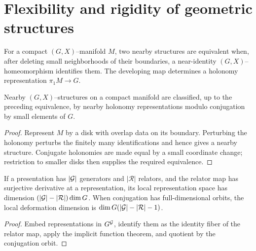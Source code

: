 \chapter{Flexibility and rigidity of geometric structures}

\begin{definition}
\label{thurston-ch05-holonomy-deformation-equivalence}
For a compact $(G,X)$--manifold $M$, two nearby structures are equivalent when, after deleting small neighborhoods of their boundaries, a near-identity $(G,X)$--homeomorphism identifies them.  The developing map determines a holonomy representation $\pi_1M\to G$.
\end{definition}

\begin{proposition}
\label{thurston-ch05-local-holonomy}
Nearby $(G,X)$--structures on a compact manifold are classified, up to the preceding equivalence, by nearby holonomy representations modulo conjugation by small elements of $G$.
\end{proposition}
\begin{proof}\sketch Represent $M$ by a disk with overlap data on its boundary.  Perturbing the holonomy perturbs the finitely many identifications and hence gives a nearby structure.  Conjugate holonomies are made equal by a small coordinate change; restriction to smaller disks then supplies the required equivalence.\end{proof}

\begin{proposition}
\label{thurston-ch05-generic-representation-dimension}
If a presentation has $|\mathcal{G}|$ generators and $|\mathcal R|$ relators, and the relator map has surjective derivative at a representation, its local representation space has dimension $(|\mathcal{G}|-|\mathcal R|)\dim G$.  When conjugation has full-dimensional orbits, the local deformation dimension is $\dim G(|\mathcal{G}|-|\mathcal R|-1)$.
\end{proposition}
\begin{proof}\sketch Embed representations in $G^{\mathcal{G}}$, identify them as the identity fiber of the relator map, apply the implicit function theorem, and quotient by the conjugation orbit.\end{proof}


